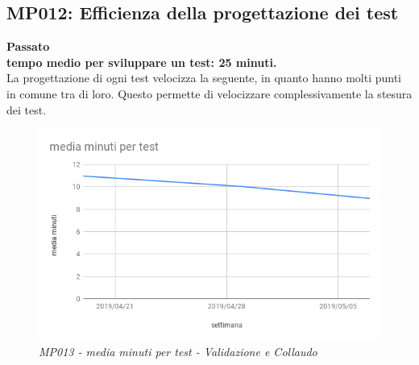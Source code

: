 \subsection{MP012: Efficienza della progettazione dei test}
\textbf{Passato}\\
\textbf{tempo medio per sviluppare un test: 25 minuti.}\\
La progettazione di ogni test velocizza la seguente, in quanto hanno molti punti in comune tra di loro. Questo permette di velocizzare complessivamente la stesura dei test.
\begin{figure} [H]
    \centering
	\includegraphics[scale=0.4]{./images/RA_test.png}
    \caption{\textit{MP013 - media minuti per test - Validazione e Collaudo}}\label{}
\end{figure}

